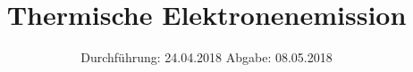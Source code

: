 

\subject{Versuch 504}
\title{Thermische Elektronenemission}
\date{%
  Durchführung: 24.04.2018
  \hspace{3em}
  Abgabe: 08.05.2018
}



\maketitle
\thispagestyle{empty}
\tableofcontents
\newpage






\printbibliography{}


